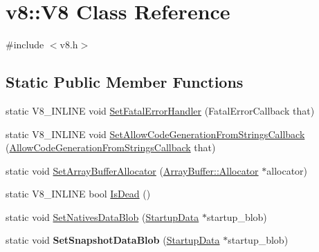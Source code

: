 \hypertarget{classv8_1_1_v8}{}\section{v8\+:\+:V8 Class Reference}
\label{classv8_1_1_v8}


{\ttfamily \#include $<$v8.\+h$>$}

\subsection*{Static Public Member Functions}
\begin{DoxyCompactItemize}
\item 
static V8\+\_\+\+I\+N\+L\+I\+N\+E void \hyperlink{classv8_1_1_v8_a290bf883bb4bf8f312089a23a628c067}{Set\+Fatal\+Error\+Handler} (Fatal\+Error\+Callback that)
\item 
static V8\+\_\+\+I\+N\+L\+I\+N\+E void \hyperlink{classv8_1_1_v8_a699f7f6cd694d83ebf3cf28b0137b811}{Set\+Allow\+Code\+Generation\+From\+Strings\+Callback} (\hyperlink{namespacev8_a521d909ec201742a1cb35d50a8e2a3c2}{Allow\+Code\+Generation\+From\+Strings\+Callback} that)
\item 
static void \hyperlink{classv8_1_1_v8_abc40950a39f8cb6946dc8a1ad41eea84}{Set\+Array\+Buffer\+Allocator} (\hyperlink{classv8_1_1_array_buffer_1_1_allocator}{Array\+Buffer\+::\+Allocator} $\ast$allocator)
\item 
static V8\+\_\+\+I\+N\+L\+I\+N\+E bool \hyperlink{classv8_1_1_v8_ae5af79b24fc62e987e08c43ee148424d}{Is\+Dead} ()
\item 
static void \hyperlink{classv8_1_1_v8_ae6a0f605e072e9e27e3666559d5c351f}{Set\+Natives\+Data\+Blob} (\hyperlink{classv8_1_1_startup_data}{Startup\+Data} $\ast$startup\+\_\+blob)
\item 
\hypertarget{classv8_1_1_v8_a231b3cd8e5578497ee36210c0411f14c}{}static void {\bfseries Set\+Snapshot\+Data\+Blob} (\hyperlink{classv8_1_1_startup_data}{Startup\+Data} $\ast$startup\+\_\+blob)\label{classv8_1_1_v8_a231b3cd8e5578497ee36210c0411f14c}


\end{DoxyCompactItemize}
